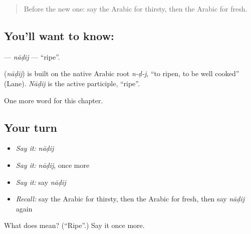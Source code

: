 \label{lesson:AR-C153-nadij}



\begin{quote}
Before the new one: say the Arabic for thirsty, then the Arabic for fresh.
\end{quote}

\subsection*{You'll want to know: }
\textbf{} — \emph{nāḍij} — \textquotedblleft{}ripe\textquotedblright{}.

\begin{cousinweb}
\textbf{} (\emph{nāḍij}) is built on the native Arabic root \emph{n-ḍ-j}, \textquotedblleft{}to ripen, to be well cooked\textquotedblright{} (Lane). \emph{Nāḍij} is the active participle, \textquotedblleft{}ripe\textquotedblright{}.
\end{cousinweb}

\begin{grammarlens}[title={What you've built}]
One more word for this chapter.
\end{grammarlens}

\subsection*{Your turn}
\begin{itemize}
\raggedright
  \item \emph{Say it:} \emph{nāḍij}
  \item \emph{Say it:} \emph{nāḍij}, once more
  \item \emph{Say it:} say \emph{nāḍij}
  \item \emph{Recall:} say the Arabic for thirsty, then the Arabic for fresh, then say \emph{nāḍij} again
\end{itemize}

\begin{tcolorbox}[breakable,colback=teal!4,colframe=teal!35!black,title={Before you move on}]
What does  mean? (\textquotedblleft{}Ripe\textquotedblright{}.) Say it once more.
\end{tcolorbox}
